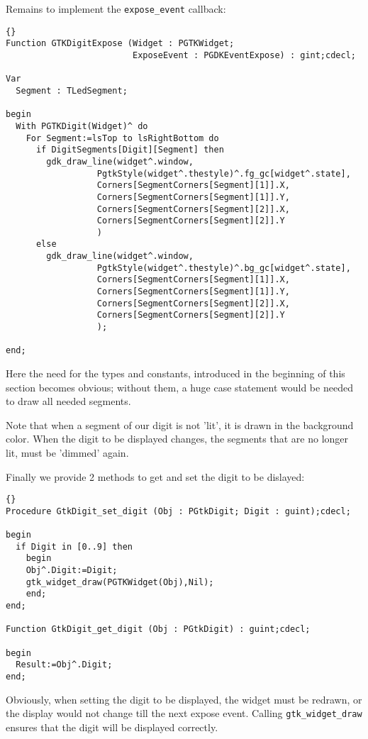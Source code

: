 \documentclass[10pt]{article}
\begin{document}
Remains to implement the \lstinline|expose_event| callback:
\begin{lstlisting}{}
Function GTKDigitExpose (Widget : PGTKWidget;
                         ExposeEvent : PGDKEventExpose) : gint;cdecl;

Var
  Segment : TLedSegment;
     
begin
  With PGTKDigit(Widget)^ do
    For Segment:=lsTop to lsRightBottom do 
      if DigitSegments[Digit][Segment] then
        gdk_draw_line(widget^.window,
                  PgtkStyle(widget^.thestyle)^.fg_gc[widget^.state],
                  Corners[SegmentCorners[Segment][1]].X,
                  Corners[SegmentCorners[Segment][1]].Y,
                  Corners[SegmentCorners[Segment][2]].X,
                  Corners[SegmentCorners[Segment][2]].Y
                  )
      else
        gdk_draw_line(widget^.window,
                  PgtkStyle(widget^.thestyle)^.bg_gc[widget^.state],
                  Corners[SegmentCorners[Segment][1]].X,
                  Corners[SegmentCorners[Segment][1]].Y,
                  Corners[SegmentCorners[Segment][2]].X,
                  Corners[SegmentCorners[Segment][2]].Y
                  );
  
end;
\end{lstlisting}
Here the need for the types and constants, introduced in the
beginning of this section becomes obvious; without them, a huge
case statement would be needed to draw all needed segments. 

Note that when a segment of our digit is not 'lit', it is drawn in the
background color. When the digit to be displayed changes, the segments 
that are no longer lit, must be 'dimmed' again.

Finally we provide 2 methods to get and set the digit to be dislayed:
\begin{lstlisting}{}
Procedure GtkDigit_set_digit (Obj : PGtkDigit; Digit : guint);cdecl;

begin
  if Digit in [0..9] then
    begin
    Obj^.Digit:=Digit;
    gtk_widget_draw(PGTKWidget(Obj),Nil);
    end;
end;

Function GtkDigit_get_digit (Obj : PGtkDigit) : guint;cdecl;

begin
  Result:=Obj^.Digit;
end;  
\end{lstlisting}
Obviously, when setting the digit to be displayed, the widget must be
redrawn, or the display would not change till the next expose event. 
Calling \lstinline|gtk_widget_draw| ensures that the digit will be displayed
correctly. 
\end{document}
